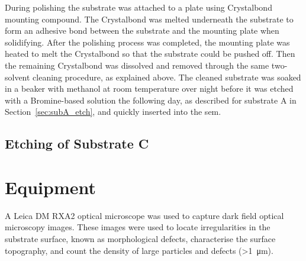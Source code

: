 During polishing the substrate was attached to a plate using Crystalbond mounting compound. The Crystalbond was melted underneath the substrate to form an adhesive bond between the substrate and the mounting plate when solidifying. After the polishing process was completed, the mounting plate was heated to melt the Crystalbond so that the substrate could be pushed off. Then the remaining Crystalbond was dissolved and removed through the same two-solvent cleaning procedure, as explained above. The cleaned substrate was soaked in a beaker with methanol at room temperature over night before it was etched with a Bromine-based solution the following day, as described for substrate A in Section~\ref{sec:subA_etch}, and quickly inserted into the \ac{sem}.

\subsection{Etching of Substrate C}


 


\section{Equipment}


A Leica DM RXA2 optical microscope was used to capture dark field optical microscopy images. These images were used to locate irregularities in the substrate surface, known as morphological defects, characterise the surface topography, and count the density of large particles and defects (\SI{>1}{\micro\metre}).

